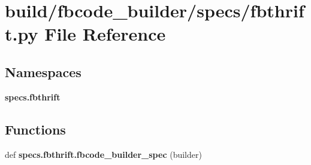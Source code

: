 \section{build/fbcode\+\_\+builder/specs/fbthrift.py File Reference}
\label{fbthrift_8py}
\subsection*{Namespaces}
\begin{DoxyCompactItemize}
\item 
 {\bf specs.\+fbthrift}
\end{DoxyCompactItemize}
\subsection*{Functions}
\begin{DoxyCompactItemize}
\item 
def {\bf specs.\+fbthrift.\+fbcode\+\_\+builder\+\_\+spec} (builder)
\end{DoxyCompactItemize}
